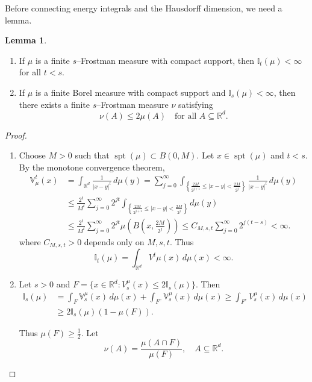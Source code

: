 \documentclass[12pt,a4paper]{report}
\theoremstyle{definition}
\newtheorem{lemma}{Lemma}
\begin{document}
\noindent
Before connecting energy integrals and the Hausdorff dimension, we need a lemma.
\begin{lemma} \label{lemma5.1}
\begin{enumerate}
    \item If $\mu$ is a finite $s$–Frostman measure with compact support, then $\mathbb{I}_t(\mu) < \infty$ for all $t < s$.
    \item If $\mu$ is a finite Borel measure with compact support and $\mathbb{I}_s(\mu) < \infty$, then there exists a finite $s$–Frostman measure $\nu$ satisfying
    \[
    \nu(A) \le 2\mu(A) \quad \text{for all } A \subseteq \mathbb{R}^d.
    \]
\end{enumerate}
\end{lemma}

\begin{proof}
\begin{enumerate}
\item Choose $M > 0$ such that $\operatorname{spt}(\mu) \subset B(0, M)$. Let $x \in \operatorname{spt}(\mu)$ and $t < s$. By the monotone convergence theorem,
\begin{align*}
\mathbb{V}^t_\mu(x) &= \int_{\mathbb{R}^d} \frac{1}{|x - y|^t} \, d\mu(y)
= \sum_{j = 0}^{\infty} \int_{\left\{ \frac{2M}{2^{j+1}} \le |x - y| < \frac{2M}{2^j} \right\}} \frac{1}{|x - y|^t} \, d\mu(y) \\
&\le \frac{2^t}{M^t} \sum_{j = 0}^{\infty} 2^{jt} \int_{\left\{ \frac{2M}{2^{j+1}} \le |x - y| < \frac{2M}{2^j} \right\}} d\mu(y) \\
&\le \frac{2^t}{M^t} \sum_{j = 0}^{\infty} 2^{jt} \mu\left( B\left(x, \frac{2M}{2^j} \right) \right)
\le C_{M,s,t} \sum_{j = 0}^{\infty} 2^{j(t - s)} < \infty.
\end{align*}
where $C_{M,s,t} > 0$ depends only on $M, s, t$. Thus
\[
\mathbb{I}_t(\mu) = \int_{\mathbb{R}^d} V^t\mu(x) \, d\mu(x) < \infty.
\]


\item Let $s > 0$ and $F = \{x \in \mathbb{R}^d : V^\mu_s(x) \le 2 \mathbb{I}_s(\mu)\}$. Then
\begin{align*}
\mathbb{I}_s(\mu)
&= \int_F \mathbb{V}^\mu_s(x) \, d\mu(x) + \int_{F^c} \mathbb{V}^\mu_s(x) \, d\mu(x)
\ge \int_{F^c} V^\mu_s(x) \, d\mu(x) \\
&\ge 2 \mathbb{I}_s(\mu)(1 - \mu(F)).
\end{align*}

Thus $\mu(F) \ge \frac{1}{2}$. Let
\[
\nu(A) = \frac{\mu(A \cap F)}{\mu(F)}, \quad A \subseteq \mathbb{R}^d.
\]


\end{enumerate}
\end{proof}
\end{document}
